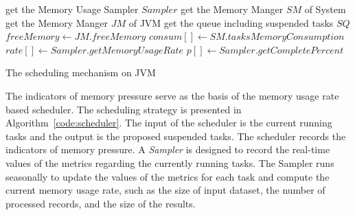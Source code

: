 \IncMargin{0.4em}
\SetAlFnt{\small}
\begin{algorithm}[!t]


get the Memory Usage Sampler $Sampler$\;
get the Memory Manger $SM$ of System\;
get the Memory Manger $JM$ of JVM\;
get the queue including suspended tasks $SQ$\;
  $freeMemory \leftarrow JM.freeMemory$\;
  $consum[] \leftarrow SM.tasksMemoryConsumption$\;
  $rate[] \leftarrow Sampler.getMemoryUsageRate$\;
  $p[] \leftarrow Sampler.getCompletePercent$\;
\lElse{\CST}

\BlankLine
{}
\BlankLine
{}
\caption{The scheduling mechanism on JVM}
\label{code:scheduler}
\end{algorithm}

The indicators of memory pressure serve as the basis of the memory usage rate based scheduler. The scheduling strategy is presented in Algorithm~\ref{code:scheduler}. The input of the scheduler is the current running tasks and the output is the proposed suspended tasks. The scheduler records the indicators of memory pressure. A \textit{Sampler} is designed to record the real-time values of the metrics regarding the currently running tasks. The Sampler runs seasonally to update the values of the metrics for each task and compute the current memory usage rate, such as the size of input dataset, the number of processed records, and the size of the results.

